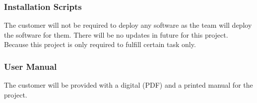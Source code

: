 \subsubsection{Installation Scripts}
The customer will not be required to deploy any software as the team will deploy the software for them. There will be no updates in future for this project. Because this project is only required to fulfill certain task only. 

\subsubsection{User Manual}
The customer will be provided with a digital (PDF) and a printed manual for the project. 